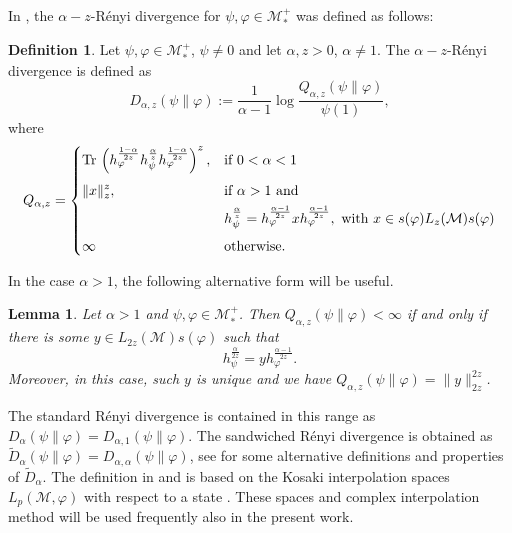\documentclass[12pt]{article}
\newtheorem{lemma}[theorem]{Lemma}
\theoremstyle{definition}
\newtheorem{defi}[theorem]{Definition}
\theoremstyle{remark}
\numberwithin{equation}{section}
\def\Me{\mathcal M}
\def \Tr{\mathrm{Tr}\,}
\begin{document}
In \cite{kato2023aremark, kato2023onrenyi}, the
$\alpha-z$-R\'enyi divergence for $\psi,\varphi\in \mathcal M_*^+$  was defined as
follows: 
\begin{defi}\label{defi:renyi} Let $\psi,\varphi\in \Me_*^+$, $\psi\ne 0$ and let
$\alpha,z>0$, $\alpha\ne 1$. The $\alpha-z$-R\'enyi divergence is defined as 
\[
D_{\alpha,z}(\psi\|\varphi):=\frac1{\alpha-1}\log
\frac{Q_{\alpha,z}(\psi\|\varphi)}{\psi(1)},
\]
where
\[
Q_{\alpha,z}=\begin{dcases} \Tr
\left(h_\varphi^{\frac{1-\alpha}{2z}}h_\psi^{\frac{\alpha}{z}}h_\varphi^{\frac{1-\alpha}{2z}}\right)^z, &
\text{if } 0<\alpha<1\\[0.3em]
\|x\|_z^z, & \text{if } \alpha>1 \text{ and }\\
\ &
h_\psi^{\frac{\alpha}{z}}=h_\varphi^{\frac{\alpha-1}{2z}}xh_\varphi^{\frac{\alpha-1}{2z}},\text{ with }
x\in s(\varphi)L_z(\Me)s(\varphi)\\[0.3em]
\infty& \text{otherwise}.
\end{dcases}
\]
\end{defi}


In the case $\alpha>1$, the following alternative form will be useful.

\begin{lemma}\cite[Lemma 7]{kato2023onrenyi} \label{lemma:renyi_2z}
Let $\alpha>1$ and $\psi,\varphi\in \Me_*^+$. Then $Q_{\alpha,z}(\psi\|\varphi)<\infty$ if
and only if there is some $y\in L_{2z}(\Me)s(\varphi)$ such that 
\[
h_\psi^{\frac{\alpha}{2z}}=yh_\varphi^{\frac{\alpha-1}{2z}}.
\]
Moreover, in this case, such $y$ is unique and we have
$Q_{\alpha,z}(\psi\|\varphi)=\|y\|_{2z}^{2z}$. 
\end{lemma}

The standard R\'enyi divergence \cite{petz1985quasi, hiai2018quantum, hiai2021quantum} is
contained in this range as $D_\alpha(\psi\|\varphi)=D_{\alpha,1}(\psi\|\varphi)$. The
sandwiched R\'enyi divergence  is obtained as $\tilde
D_\alpha(\psi\|\varphi)=D_{\alpha,\alpha}(\psi\|\varphi)$, see
\cite{berta2018renyi,hiai2021quantum,jencova2018renyi, jencova2021renyi} for some
alternative definitions and properties of $\tilde D_\alpha$. The definition in
\cite{jencova2018renyi} and \cite{jencova2021renyi} is based on the Kosaki interpolation
spaces  $L_p(\Me,\varphi)$ with respect to a state \cite{kosaki1984applications}. These spaces and
complex interpolation method will be used frequently also in the present work. 
\end{document}
